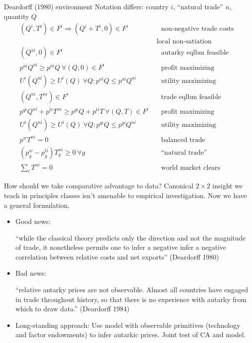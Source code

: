 \documentclass[10pt,notes=hide]{beamer}
\begin{document}
\begin{frame}{Deardorff (1980) environment}
Notation differs: country $i$, ``natural trade'' $n$, quantity $Q$
{\small
\begin{align}
(Q^i,T^i) \in F^i \Rightarrow (Q^i+T^i,0) \in F^i &\quad \text{non-negative trade costs}\\
&\text{ local non-satiation } \\
(Q^{ai},0) \in F^i &\quad \text{autarky eqlbm feasible} \\
p^{ai} Q^{ai} \geq p^{ai} Q \ \forall (Q,0) \in F^i &\quad \text{profit maximizing} \\
U^i(Q^{ai}) \geq U^i(Q) \ \forall Q: p^{ai} Q \leq p^{ai} Q^{ai} &\quad \text{utility maximizing} \\
(Q^{ni},T^{ni}) \in F^i &\quad \text{trade eqlbm feasible} \\
p^{qi} Q^{ni} +p^{ti}T^{ni} \geq p^{qi} Q +p^{ti}T \ \forall (Q,T) \in F^i &\quad \text{profit maximizing} \\
U^i(Q^{ni}) \geq U^i(Q) \ \forall Q: p^{qi} Q \leq p^{qi} Q^{ni} &\quad \text{utility maximizing} \\
p^w T^{ni} = 0  &\quad \text{balanced trade} \\
(p^w_g - p^{ti}_g) T_g^{ni} \geq 0 \ \forall g &\quad \text{``natural trade''} \\
\sum_i T^{ni} = 0 &\quad \text{world market clears}
\end{align}
}
\end{frame}
\begin{frame}{How should we take comparative advantage to data?}
Canonical $2\times2$ insight we teach in principles classes isn't amenable to empirical investigation.
Now we have a general formulation.
\begin{itemize}
	\item Good news: {``while the classical theory predicts only the direction and not the magnitude of trade, it nonetheless permits one to infer a negative infer a negative correlation between relative costs and net exports'' (Deardorff 1980) \par}
	\item Bad news: {``relative antarky prices are not observable. Almost all countries have engaged in trade throughout history, so that there is no experience with autarky from which to draw data.'' (Deardorff 1984) \par}
	\item Long-standing approach: Use model with observable primitives (technology and factor endowments) to infer autarkic prices. Joint test of CA and model.
\end{itemize}
\end{frame}
\end{document}
